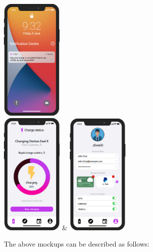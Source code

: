 \begin{table}[H]
\begin{tabu}
  \includegraphics[width=30mm]{images/notific.png}\label{fig:notificationView} \\
  \includegraphics[width=30mm]{images/stopcharge.png}\label{fig:stopProcess} &
  \includegraphics[width=30mm]{images/user.png}\label{fig:personalInformation} \\
\end{tabu}
\end{table}
The above mockups can be described as follows:
